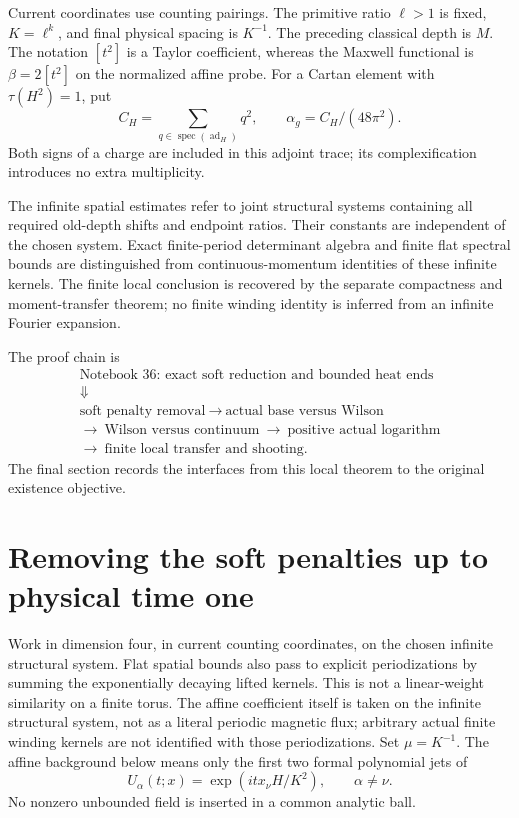 \documentclass[11pt]{article}
\theoremstyle{remark}
\begin{document}
Current coordinates use counting pairings. The primitive ratio
\(\ell>1\) is fixed, \(K=\ell^k\), and final physical spacing is
\(K^{-1}\). The preceding classical depth is \(M\).
The notation \([t^2]\) is a Taylor coefficient, whereas the Maxwell
functional is \(\beta=2[t^2]\) on the normalized affine probe.
For a Cartan element with \(\tau(H^2)=1\), put
\[
 C_H=\sum_{q\in\operatorname{spec}(\operatorname{ad}_H)}q^2,
 \qquad \alpha_g=C_H/(48\pi^2).
\]
Both signs of a charge are included in this adjoint trace; its
complexification introduces no extra multiplicity.

The infinite spatial estimates refer to joint structural systems
containing all required old-depth shifts and endpoint ratios. Their
constants are independent of the chosen system. Exact finite-period
determinant algebra and finite flat spectral bounds are distinguished
from continuous-momentum identities of these infinite kernels.
The finite local conclusion is recovered by the separate compactness
and moment-transfer theorem; no finite winding identity is inferred
from an infinite Fourier expansion.

The proof chain is
\[
 \begin{gathered}
 \text{Notebook 36: exact soft reduction and bounded heat ends}\\
 \Downarrow\\
 \text{soft penalty removal}
 \ \longrightarrow\ \text{actual base versus Wilson}\\
 \longrightarrow\ \text{Wilson versus continuum}
 \ \longrightarrow\ \text{positive actual logarithm}\\
 \longrightarrow\ \text{finite local transfer and shooting}.
 \end{gathered}
\]
The final section records the interfaces from this local theorem
to the original existence objective.



\section{Removing the soft penalties up to physical time one}
\label{spb-section}

Work in dimension four, in current counting coordinates, on the chosen
infinite structural system. Flat spatial bounds also pass to explicit periodizations by summing the exponentially decaying lifted kernels. This is not a linear-weight similarity on a finite torus. The affine coefficient itself is taken on the infinite structural system, not as a literal periodic magnetic flux; arbitrary actual finite winding kernels are not identified with those periodizations.
Set $\mu=K^{-1}$. The affine background below means only the first
two formal polynomial jets of
\[
 U_\alpha(t;x)=\exp(i t x_\nu H/K^2),\qquad \alpha\ne\nu.
\]
No nonzero unbounded field is inserted in a common analytic ball.
\end{document}
